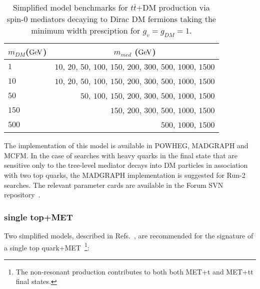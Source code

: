 \documentclass[debug,notitlepage]{dmfm}
\newcommand{\mdm}{\ensuremath{m_{DM}}\xspace}
\newif\ifATLAS
\newif\ifCMS
\begin{document}
\begin{table}[!ht]
\centering
\begin{tabular}{| l | r |}
\hline
\multicolumn{1}{|c|}{\mdm (${\rm GeV}$)} & \multicolumn{1}{c|}{$m_{med}$ (${\rm GeV}$)} \\
\hline
 $1$    & $10$, $20$, $50$, $100$, $150$, $200$, $300$, $500$, $1000$, $1500$  \\
 $10$   & $10$, $20$, $50$, $100$, $150$, $200$, $300$, $500$, $1000$, $1500$  \\
 $50$   &             $50$, $100$, $150$, $200$, $300$, $500$, $1000$, $1500$  \\
 $150$  &                          $150$, $200$, $300$, $500$, $1000$, $1500$  \\
 $500$  &                                               $500$, $1000$, $1500$  \\
\hline
\end{tabular}
\caption{Simplified model benchmarks for $t\bar{t}$+DM production via spin-0 mediators decaying to Dirac DM fermions taking the minimum width presciption for $g_v = g_{DM} = 1$.}
\label{tab:ttdm_benchmarks}
\end{table}

The implementation of this model is available in POWHEG, MADGRAPH
and MCFM. In the case of searches with heavy quarks in the final state
that are sensitive only to the tree-level mediator decays into DM particles
in association with two top quarks, the MADGRAPH implementation is suggested
for Run-2 searches. The relevant parameter cards are available in the Forum 
SVN repository~\cite{ForumSVN_DMTTBar}.


\ifATLAS 
The ATLAS implementation of this model using on-the-fly Madgraph
will follow the MC15 pilot request for the monophoton D5 operator~\cite{ATLAS_PowhegPythiaMC15Test}. 
\fi

\ifCMS
\textbf{[Open point: Add here implementation details for CMS..]}
\fi

\subsubsection{single top+MET}

Two simplified models, described in Refs.~\cite{Andrea:2011ws,Boucheneb:2014wza}, are recommended 
for the signature of a single top quark+MET~\footnote{The non-resonant production 
contributes to both both MET+t and MET+tt final states.}:
\end{document}
